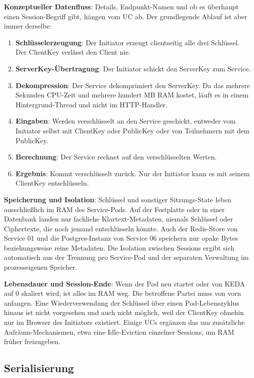 \textbf{Konzeptueller Datenfluss}:
Details, Endpunkt-Namen und ob es überhaupt einen Session-Begriff gibt, hängen vom UC ab. Der grundlegende Ablauf ist aber immer derselbe:

\begin{enumerate}
    \item \textbf{Schlüsselerzeugung}: Der Initiator erzeugt clientseitig alle drei Schlüssel. Der ClientKey verlässt den Client nie.
    \item \textbf{ServerKey-Übertragung}: Der Initiator schickt den ServerKey zum Service.
    \item \textbf{Dekompression}: Der Service dekomprimiert den ServerKey. Da das mehrere Sekunden CPU-Zeit und mehrere hundert MB RAM kostet, läuft es in einem Hintergrund-Thread und nicht im HTTP-Handler.
    \item \textbf{Eingaben}: Werden verschlüsselt an den Service geschickt, entweder vom Initiator selbst mit ClientKey oder PublicKey oder von Teilnehmern mit dem PublicKey.
    \item \textbf{Berechnung}: Der Service rechnet auf den verschlüsselten Werten.
    \item \textbf{Ergebnis}: Kommt verschlüsselt zurück. Nur der Initiator kann es mit seinem ClientKey entschlüsseln.
\end{enumerate}

\textbf{Speicherung und Isolation}:
Schlüssel und sonstiger Sitzungs-State leben ausschließlich im RAM des Service-Pods. Auf der Festplatte oder in einer Datenbank landen nur fachliche Klartext-Metadaten, niemals Schlüssel oder Ciphertexte, die noch jemand entschlüsseln könnte. Auch der Redis-Store von Service 01 und die Postgres-Instanz von Service 06 speichern nur opake Bytes beziehungsweise reine Metadaten. Die Isolation zwischen Sessions ergibt sich automatisch aus der Trennung pro Service-Pod und der separaten Verwaltung im prozesseigenen Speicher.

\textbf{Lebensdauer und Session-Ende}:
Wenn der Pod neu startet oder von KEDA auf 0 skaliert wird, ist alles im RAM weg. Die betroffene Partei muss von vorn anfangen. Eine Wiederverwendung der Schlüssel über einen Pod-Lebenszyklus hinaus ist nicht vorgesehen und auch nicht möglich, weil der ClientKey ohnehin nur im Browser des Initiators existiert. Einige UCs ergänzen das um zusätzliche Aufräum-Mechanismen, etwa eine Idle-Eviction einzelner Sessions, um RAM früher freizugeben.

\subsection{Serialisierung}
\label{sub:serialisierung}

